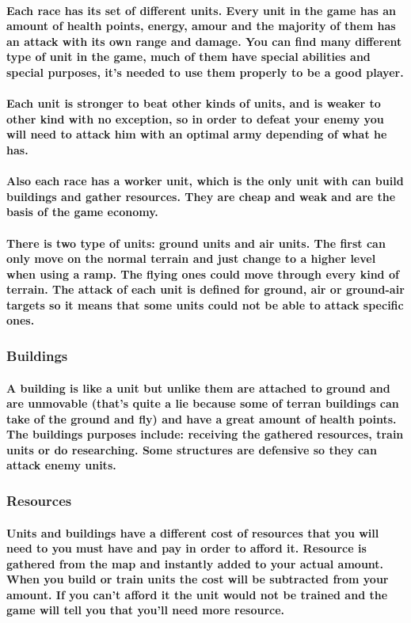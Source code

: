 \documentclass[a4paper,10pt]{article}
\newcommand{\p}[1]{\paragraph{\indent\textnormal{#1}}}
\begin{document}
      \p{Each race has its set of different units. Every unit in the game has an amount of health points, energy, amour and the majority of them has an attack with its own range and damage. You can find many different type of unit in the game, much of them have special abilities and special purposes, it's needed to use them properly to be a good player.}

      \p{Each unit is stronger to beat other kinds of units, and is weaker to other kind with no exception, so in order to defeat your enemy you will need to attack him with an optimal army depending of what he has.}

      \p{Also each race has a worker unit, which is the only unit with can build buildings and gather resources. They are cheap and weak and are the basis of the game economy.}

      \p{There is two type of units: ground units and air units. The first can only move on the normal terrain and just change to a higher level when using a ramp. The flying ones could move through every kind of terrain. The attack of each unit is defined for ground, air or ground-air targets so it means that some units could not be able to attack specific ones.}


    \subsubsection{Buildings}

      \p{A building is like a unit but unlike them are attached to ground and are unmovable (that's quite a lie because some of terran buildings can take of the ground and fly) and have a great amount of health points. The buildings purposes include: receiving the gathered resources, train units or do researching. Some structures are defensive so they can attack enemy units.}


    \subsubsection{Resources}

     \p{Units and buildings have a different cost of resources that you will need to you must have and pay in order to afford it. Resource is gathered from the map and instantly added to your actual amount. When you build or train units the cost will be subtracted from your amount. If you can't afford it the unit would not be trained and the game will tell you that you'll need more resource.}
\end{document}
